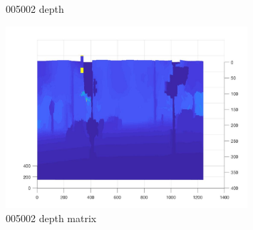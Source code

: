 \documentclass{csc_assignment4}
\begin{document}
\begin{description}
\begin{enumerate}[label=(\alph*)]
\begin{figure}[t!]
\vspace*{-5mm}
\caption{005002 depth}
\end{figure}
\begin{figure}
\includegraphics[width=0.8\textwidth, center]{data/a4q1c/005002.jpg}
\vspace*{-5mm}
\caption{005002 depth matrix}
\end{figure}


\end{enumerate}
\end{description}
\end{document}
